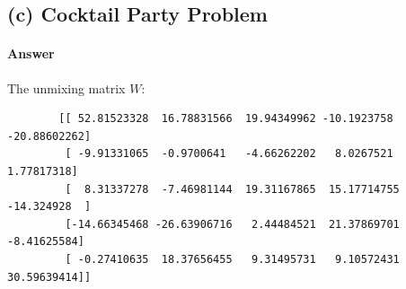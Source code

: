 \documentclass[11pt]{article}
\begin{document}
	\newpage
	\subsection{(c) Cocktail Party Problem}
	\paragraph{Answer} The unmixing matrix $W$:
	\begin{verbatim}
		[[ 52.81523328  16.78831566  19.94349962 -10.1923758  -20.88602262]
		 [ -9.91331065  -0.9700641   -4.66262202   8.0267521    1.77817318]
		 [  8.31337278  -7.46981144  19.31167865  15.17714755 -14.324928  ]
		 [-14.66345468 -26.63906716   2.44484521  21.37869701  -8.41625584]
		 [ -0.27410635  18.37656455   9.31495731   9.10572431  30.59639414]]
	\end{verbatim}
\end{document}
